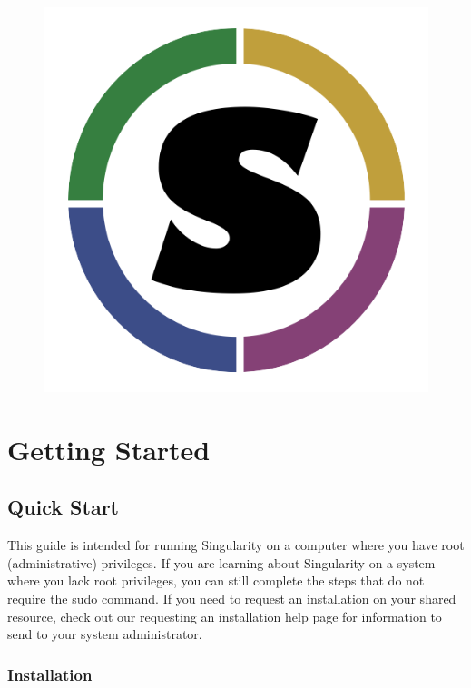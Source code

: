 \documentclass[a4paper]{article}
\date{\vspace{-5ex}}
\begin{document}
\begin{figure}
\centering
{\includegraphics[scale=0.25]{assets/img/logo.png}}
\end{figure}

\justify


\section{Getting Started}
\subsection{Quick Start}
\label{sec:quickstart}

This guide is intended for running Singularity on a computer where you have root (administrative) privileges. If you are learning about Singularity on a system where you lack root privileges, you can still complete the steps that do not require the sudo command. If you need to request an installation on your shared resource, check out our requesting an installation help page for information to send to your system administrator.

\newpage


\tableofcontents
\newpage

\subsubsection{Installation}
\end{document}

